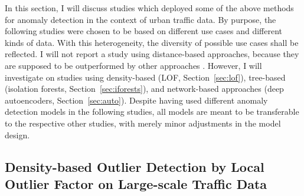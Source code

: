 \documentclass[conference]{IEEEtran}
\begin{document}
In this section, I will discuss studies which deployed some of the above methods for anomaly detection in the context of urban traffic data. By purpose, the following studies were chosen to be based on different use cases and different kinds of data. With this heterogeneity, the diversity of possible use cases shall be reflected. I will not report a study using distance-based approaches, because they are supposed to be outperformed by other approaches \cite{chen2010comparison}. However, I will investigate on studies using density-based (LOF, Section~\ref{sec:lof}), tree-based (isolation forests, Section~\ref{sec:iforests}), and network-based approaches (deep autoencoders, Section~\ref{sec:auto}). Despite having used different anomaly detection models in the following studies, all models are meant to be transferable to the respective other studies, with merely minor adjustments in the model design.   

\subsection{Density-based Outlier Detection by Local Outlier Factor on Large-scale Traffic Data \cite{ma2016density}}
\label{sec:ex1}
\end{document}
